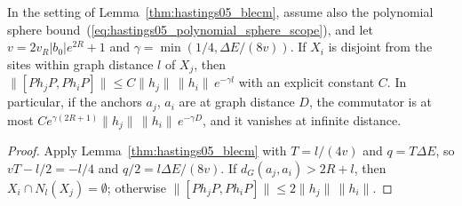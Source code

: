 \begin{lemma}
    \label{thm:hastings05_blecm_exp}
    \leanok
    In the setting of Lemma~\ref{thm:hastings05_blecm}, assume also the
    polynomial sphere bound~(\ref{eq:hastings05_polynomial_sphere_scope}), and let
    $v=2v_R|b_0|e^{2R}+1$ and $\gamma=\min(1/4,\Delta E/(8v))$. If $X_i$ is
    disjoint from the sites within graph distance $l$ of $X_j$, then
    $\|[Ph_jP,Ph_iP]\|\le C\|h_j\|\,\|h_i\|\,e^{-\gamma l}$ with an explicit
    constant $C$. In particular, if the anchors $a_j$, $a_i$ are at graph
    distance $D$, the commutator is at most
    $Ce^{\gamma(2R+1)}\|h_j\|\,\|h_i\|\,e^{-\gamma D}$, and it vanishes at
    infinite distance.
\end{lemma}
\begin{proof}\leanok
    Apply Lemma~\ref{thm:hastings05_blecm} with $T=l/(4v)$ and $q=T\Delta E$,
    so $vT-l/2=-l/4$ and $q/2=l\Delta E/(8v)$. If $d_G(a_j,a_i)>2R+l$, then
    $X_i\cap N_l(X_j)=\emptyset$; otherwise
    $\|[Ph_jP,Ph_iP]\|\le2\|h_j\|\,\|h_i\|$.
\end{proof}


